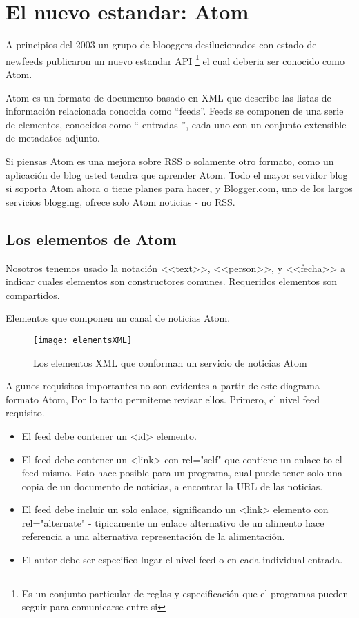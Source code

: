 \section{El nuevo estandar: Atom}

A principios del 2003 un grupo de blooggers desilucionados con estado de newfeeds publicaron un nuevo estandar API
\footnote{Es un conjunto particular de reglas y especificaci\'{o}n que el programas pueden seguir para comunicarse entre si} el cual deberia ser conocido como Atom.

Atom es un formato de documento basado en XML que describe las listas de informaci\'{o}n relacionada conocida como
\textquotedblleft feeds\textquotedblright. Feeds se componen de una serie de elementos, conocidos como \textquotedblleft 
entradas \textquotedblright, cada uno con un conjunto extensible de metadatos adjunto.%

Si piensas Atom es una mejora sobre RSS o solamente otro formato, como un aplicación de blog usted 
tendra que aprender Atom. Todo el mayor servidor blog si soporta Atom ahora o tiene planes para hacer, y Blogger.com,
uno de los largos servicios blogging, ofrece solo Atom noticias - no RSS.\cite{johnson2006rss}


\subsection{Los elementos de Atom}


Nosotros tenemos usado la notación <<text>>, <<person>>, y <<fecha>> a indicar cuales elementos son constructores
comunes. Requeridos elementos son compartidos.

Elementos que componen un canal de noticias Atom.

\begin{figure}[!ht]
\centering
\texttt{[image: elementsXML]}
\caption{Los elementos XML que conforman un servicio de noticias Atom}
\end{figure}


Algunos requisitos importantes no son evidentes a partir de este diagrama formato Atom, Por lo tanto permiteme
revisar ellos. Primero, el nivel feed requisito.

\begin{itemize}

\item El feed debe contener un <id> elemento.
\item El feed debe contener un <link> con rel="self" que contiene un enlace to el feed mismo. Esto hace posible para
un programa, cual puede tener solo una copia de un documento de noticias, a encontrar la URL de las noticias.
\item El feed debe incluir un solo enlace, significando un <link> elemento con rel="alternate" - tipicamente un enlace
alternativo de un alimento hace referencia a una alternativa representación de la alimentación.
\item El autor debe ser especifico lugar el nivel feed o en cada individual entrada.

\end{itemize}

